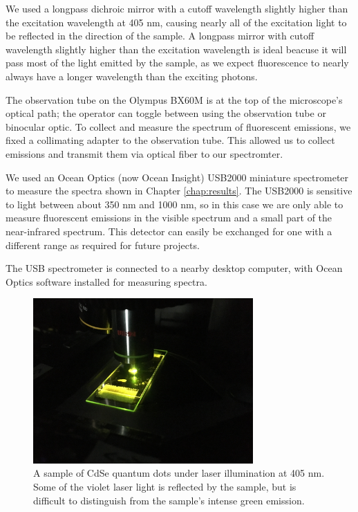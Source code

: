 We used a longpass dichroic mirror with a cutoff wavelength slightly higher than the excitation wavelength at 405 nm, causing nearly all of the excitation light to be reflected in the direction of the sample. A longpass mirror with cutoff wavelength slightly higher than the excitation wavelength is ideal beacuse it will pass most of the light emitted by the sample, as we expect fluorescence to nearly always have a longer wavelength than the exciting photons.


The observation tube on the Olympus BX60M is at the top of the microscope's optical path; the operator can toggle between using the observation tube or binocular optic. To collect and measure the spectrum of fluorescent emissions, we fixed a collimating adapter to the observation tube. This allowed us to collect emissions and transmit them via optical fiber to our spectromter.

We used an Ocean Optics (now Ocean Insight) USB2000 miniature spectrometer to measure the spectra shown in Chapter \ref{chap:results}. The USB2000 is sensitive to light between about 350 nm and 1000 nm, so in this case we are only able to measure fluorescent emissions in the visible spectrum and a small part of the near-infrared spectrum. This detector can easily be exchanged for one with a different range as required for future projects.

The USB spectrometer is connected to a nearby desktop computer, with Ocean Optics software installed for measuring spectra.

\begin{figure}[H]
    \centering
    \includegraphics[width=0.75\textwidth]{img/objective-sample.JPG}
    \caption[Sample on stage under laser illumination.]{A sample of CdSe quantum dots under laser illumination at 405 nm. Some of the violet laser light is reflected by the sample, but is difficult to distinguish from the sample's intense green emission.}
    \label{img:objective-sample}
\end{figure}

